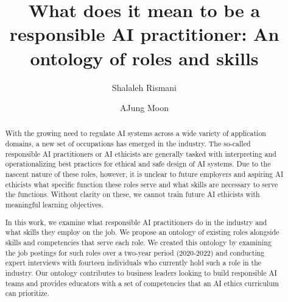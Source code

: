\documentclass[sigconf]{acmart}
\begin{document}

\title{What does it mean to be a responsible AI practitioner: An ontology of roles and skills}

\author{Shalaleh Rismani}


\author{AJung Moon}


\renewcommand{\shortauthors}{Rismani et al.}

\begin{abstract}
With the growing need to regulate AI systems across a wide variety of application domains, a new set of occupations has emerged in the industry. The so-called responsible \ac{AI} practitioners or \ac{AI} ethicists are generally tasked with interpreting and operationalizing best practices for ethical and safe design of \ac{AI} systems. 
Due to the nascent nature of these roles, however, it is unclear to future employers and aspiring AI ethicists what specific function these roles serve and what skills are necessary to serve the functions. Without clarity on these, we cannot train future \ac{AI} ethicists with meaningful learning objectives.

In this work, we examine what responsible \ac{AI} practitioners do in the industry and what skills they employ on the job. We propose an ontology of existing roles alongside skills and competencies that serve each role. We created this ontology by examining the job postings for such roles over a two-year period (2020-2022) and conducting expert interviews with fourteen individuals who currently hold such a role in the industry. Our ontology contributes to business leaders looking to build responsible \ac{AI} teams and provides educators with a set of competencies that an AI ethics curriculum can prioritize. 
\end{abstract}
\end{document}

